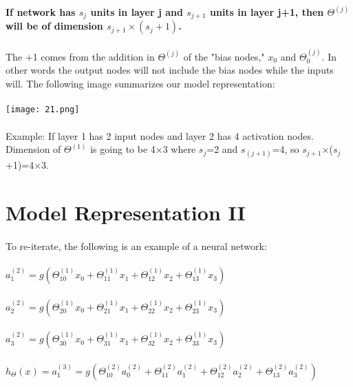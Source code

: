\documentclass[UTF8]{ctexart}
\begin{document}
\paragraph{}
\textbf{If network has $s_{j}$ units in layer j and $s_{j+1}$ units in layer j+1, then $ \Theta^{(j)} $ will be of dimension $ s_{j+1}\times(s_{j}+1) $.}
\paragraph{}
The +1 comes from the addition in $\Theta^{(j)}$ of the "bias nodes," $x_{0}$ and $\Theta_{0}^{(j)}$. In other words the output nodes will not include the bias nodes while the inputs will. The following image summarizes our model representation:
\paragraph{}
\texttt{[image: 21.png]}
\paragraph{}
Example: If layer 1 has 2 input nodes and layer 2 has 4 activation nodes. Dimension of $\Theta^{(1)}$ is going to be 4×3 where $s_{j}$=2 and $s_{(j+1)}$=4, so $s_{j+1}$×($s_{j}$+1)=4×3.
\newpage
\section{Model Representation II}
\paragraph{}
To re-iterate, the following is an example of a neural network:
\begin{algorithm}
\paragraph{}
$a_{1}^{(2)}=g(\Theta_{10}^{(1)}x_{0}+\Theta_{11}^{(1)}x_{1}+\Theta_{12}^{(1)}x_{2}+\Theta_{13}^{(1)}x_{3})$
\paragraph{}
$a_{2}^{(2)}=g(\Theta_{20}^{(1)}x_{0}+\Theta_{21}^{(1)}x_{1}+\Theta_{22}^{(1)}x_{2}+\Theta_{23}^{(1)}x_{3})$
\paragraph{}
$a_{3}^{(2)}=g(\Theta_{30}^{(1)}x_{0}+\Theta_{31}^{(1)}x_{1}+\Theta_{32}^{(1)}x_{2}+\Theta_{33}^{(1)}x_{3})$
\paragraph{}
$h_{\Theta}(x)=a_{1}^{(3)}=g(\Theta_{10}^{(2)}a_{0}^{(2)}+\Theta_{11}^{(2)}a_{1}^{(2)}+\Theta_{12}^{(2)}a_{2}^{(2)}+\Theta_{13}^{(2)}a_{3}^{(2)})$
\end{algorithm}
\end{document}
